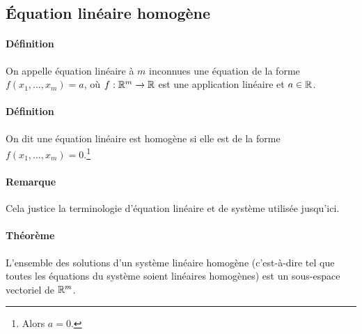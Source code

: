 %
\subsection{Équation linéaire homogène}
%

\paragraph{Définition} On appelle équation linéaire à $m$ inconnues une équation de la forme $f(x_1, \ldots, x_m) = a$, où $f: \mathbb{R}^m \rightarrow \mathbb{R}$ est une application linéaire et $a \in \mathbb{R}$.

\paragraph{Définition} On dit une équation linéaire est homogène si elle est de la forme $f(x_1, \ldots, x_m) = 0$.\footnote{Alors $a = 0$.}

\paragraph{Remarque} Cela justice la terminologie d'équation linéaire et de système utilisée jusqu'ici.

\paragraph{Théorème} L'ensemble des solutions d'un système linéaire homogène (c'est-à-dire tel que toutes les équations du système soient linéaires homogènes) est un sous-espace vectoriel de $\mathbb{R}^m$.


